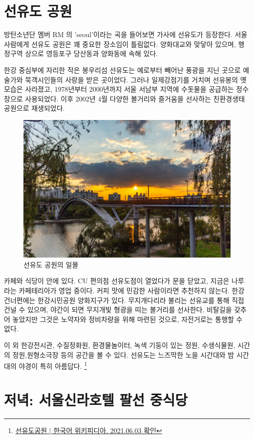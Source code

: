 \section{선유도 공원}
방탄소년단 멤버 RM 의 'seoul'이라는 곡을 들어보면 가사에 선유도가 등장한다. 서울
사람에게 선유도 공원은 꽤 중요한 장소임이 틀림없다. 양화대교와 맞닿아 있으며, 
행정구역 상으로 영등포구 당산동과 양화동에 속해 있다.

한강 중심부에 자리한 작은 봉우리섬 선유도는 예로부터 빼어난 풍광을 지닌 곳으로
예술가와 묵객시인들의 사랑을 받은 곳이었다. 그러나 일제강점기를 거치며 선유봉의 옛
모습은 사라졌고, 1978년부터 2000년까지 서울 서남부 지역에 수돗물을 공급하는 
정수장으로 사용되었다. 이후 2002년 4월 다양한 볼거리와 즐거움을 선사하는 
친환경생태공원으로 재생되었다.


\begin{figure}[ht]
    \centering
    \includegraphics[width=.6\textwidth]{e_img/ww_-006.jpg}
    \caption{선유도 공원의 일몰}
    \label{fig:haryu7}
\end{figure}

카페와 식당이 안에 있다. CU 편의점 선유도점이 열었다가 문을 닫았고, 지금은 
나루라는 카페테리아가 영업 중이다. 커피 맛에 민감한 사람이라면 추천하지 않는다. 한강 
건너편에는 한강시민공원 양화지구가 있다. 무지개다리라 불리는 선유교를 통해 직접 건널 수
있으며, 야간이 되면 무지개빛 형광을 띠는 볼거리를 선사한다. 비탈길을 갖추어 놓았지만
그것은 노약자와 정비차량을 위해 마련된 것으로, 자전거로는 통행할 수 없다.


이 외 한강전시관, 수질정화원, 환경물놀이터, 녹색 기둥이 있는 정원, 수생식물원,
시간의 정원,원형소극장 등의 공간을 볼 수 있다. 선유도는 느즈막한 노을 시간대와 밤 
시간대의 야경이 특히 아름답다.
\footnote{\href{https://ko.wikipedia.org/wiki/선유도공원}{선유도공원 $|$ 한국어 위키피디아. 2021.06.03 확인}}


\section{저녁: 서울신라호텔 팔선 중식당}


